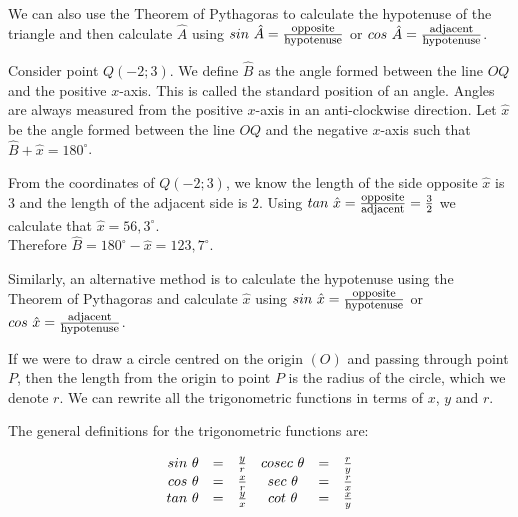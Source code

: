 We can also use the Theorem of Pythagoras to calculate the hypotenuse of the triangle and then calculate $\hat{A}$ using $sin~ \hat{A} = \frac{\mbox{\footnotesize opposite}}{\mbox{\footnotesize hypotenuse}}$ or $cos~ \hat{A} = \frac{\mbox{\footnotesize adjacent}}{\mbox{\footnotesize hypotenuse}}$. \par
Consider point $Q(-2;3)$. We define $\hat{B}$ as the angle formed between the line $OQ$ and the positive $x$-axis. This is called the standard position of an angle. Angles are always measured from the positive $x$-axis in an anti-clockwise direction. Let $\hat{x}$ be the angle formed between the line $OQ$ and the negative $x$-axis such that $\hat{B} + \hat{x} = 180^{\circ}$.
\par

From the coordinates of $Q(-2;3)$, we know the length of the side opposite $\hat{x}$ is $3$ and the length of the adjacent side is $2$. Using $tan~ \hat{x}=\frac{\mbox{\footnotesize opposite}}{\mbox{\footnotesize adjacent}} = \frac{3}{2}$ we calculate that $\hat{x}=56,3^{\circ}$.
\\Therefore $\hat{B}=180^{\circ} - \hat{x} = 123,7^{\circ}$.\par

Similarly, an alternative method is to calculate the hypotenuse using the Theorem of Pythagoras and calculate $\hat{x}$ using $sin~ \hat{x} = \frac{\mbox{\footnotesize opposite}}{\mbox{\footnotesize hypotenuse}}$ or $cos~ \hat{x} = \frac{\mbox{\footnotesize adjacent}}{\mbox{\footnotesize hypotenuse}}$. \par
If we were to draw a circle centred on the origin $(O)$ and passing through point $P$, then the length from the origin to point $P$ is the radius of the circle, which we denote $r$. We can rewrite all the trigonometric functions in terms of $x$, $y$ and $r$.


The general definitions for the trigonometric functions are:

\begin{equation*}
\begin{array}{cccccc}\hfill sin~ \theta & =& \frac{y}{r}\hfill & cosec~ \theta & =& \frac{r}{y}\hfill \\
 \hfill cos~ \theta & =& \frac{x}{r}\hfill & sec~ \theta & =& \frac{r}{x}\hfill \\
 \hfill tan~ \theta & =& \frac{y}{x}\hfill & cot~ \theta & =& \frac{x}{y}\hfill \end{array}
\end{equation*}



